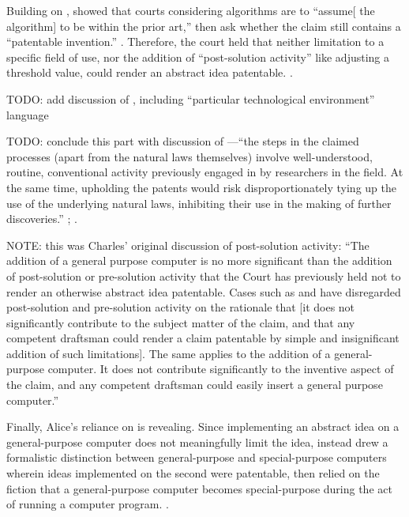 \documentclass{scotus}
\begin{document}
Building on ,  showed that courts considering
algorithms are to “assume[ the algorithm] to be within the prior art,” then ask
whether the claim still contains a “patentable invention.”  .  Therefore,
the court held that neither limitation to a specific field of use, nor the
addition of “post-solution activity” like adjusting a threshold value, could
render an abstract idea patentable.  . 

TODO: add discussion of , including “particular technological
environment” language

TODO: conclude this part with discussion of —“the steps in the
claimed processes (apart from the natural laws themselves) involve
well-understood, routine, conventional activity previously engaged in by
researchers in the field. At the same time, upholding the patents would risk
disproportionately tying up the use of the underlying natural laws, inhibiting
their use in the making of further discoveries.”  ;
.

NOTE: this was Charles’ original discussion of post-solution activity: “The
addition of a general purpose computer is no more significant than the addition
of post-solution or pre-solution activity that the Court has previously held not
to render an otherwise abstract idea patentable. Cases such as  and
 have disregarded post-solution and pre-solution activity on the
rationale that [it does not significantly contribute to the subject matter of
the claim, and that any competent draftsman could render a claim patentable by
simple and insignificant addition of such limitations]. The same applies to the
addition of a general-purpose computer. It does not contribute significantly to
the inventive aspect of the claim, and any competent draftsman could easily
insert a general purpose computer.”

%
Finally, Alice’s reliance on  is revealing.  Since implementing
an abstract idea on a general-purpose computer does not meaningfully limit the
idea,  instead drew a formalistic distinction between
general-purpose and special-purpose computers wherein ideas implemented on the
second were patentable, then relied on the fiction that a general-purpose
computer becomes special-purpose during the act of running a computer program.
.    
\end{document}
